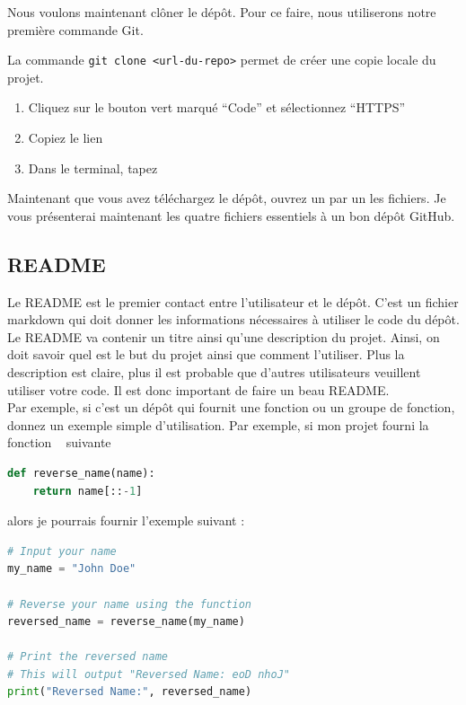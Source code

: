 \documentclass{book}
\newenvironment{myexampleblock}[1]{%
    \tcolorbox[beamer,%
    noparskip,breakable,
    colback=LightGreen,colframe=DarkGreen,%
    colbacklower=LimeGreen!75!LightGreen,%
    title={#1}, width=\textwidth]}%
    {\endtcolorbox}
\newenvironment{myblock}[1]{%
    \tcolorbox[beamer,%
    noparskip,breakable,
    colback=LightBlue,colframe=DarkBlue,%
    colbacklower=DarkBlue!75!LightBlue,%
    title={#1}, width=\textwidth]}%
    {\endtcolorbox}
\newcommand{\code}[1]{\mbox{%
    \ttfamily
    \tcbox[
        on line,
        boxsep=0pt, left=4pt, right=4pt, top=2pt, bottom=1.5pt,
        toprule=0pt, rightrule=0pt, bottomrule=0pt, leftrule=0pt,
        oversize=0pt, enlarge left by=0pt, enlarge right by=0pt,
        colframe=white, colback=black!12,
        height=.8\baselineskip %
    ]{#1}%
}}
\begin{document}
Nous voulons maintenant clôner le dépôt. Pour ce faire, nous utiliserons notre première commande Git.

\begin{myblock}{\href{https://git-scm.com/docs/git-clone}{git clone}}
    La commande \texttt{git clone <url-du-repo>} permet de créer une copie locale du projet. 
\end{myblock}

\begin{myexampleblock}{Exercice : Clôner le dépôt du tutoriel}
    \begin{enumerate}
        \item Cliquez sur le bouton vert marqué ``Code'' et sélectionnez ``HTTPS''
        \item Copiez le lien
        \item Dans le terminal, tapez \code{\texttt{git clone <lien-du-repo>}}
    \end{enumerate}
\end{myexampleblock}

Maintenant que vous avez téléchargez le dépôt, ouvrez un par un les fichiers. Je vous présenterai maintenant les quatre fichiers essentiels à un bon dépôt GitHub.

\subsection{README}

Le README est le premier contact entre l'utilisateur et le dépôt. C'est un fichier markdown qui doit donner les informations nécessaires à utiliser le code du dépôt. Le README va contenir un titre ainsi qu'une description du projet. Ainsi, on doit savoir quel est le but du projet ainsi que comment l'utiliser. Plus la description est claire, plus il est probable que d'autres utilisateurs veuillent utiliser votre code. Il est donc important de faire un beau README. \\

Par exemple, si c'est un dépôt qui fournit une fonction ou un groupe de fonction, donnez un exemple simple d'utilisation. Par exemple, si mon projet fourni la fonction \code{\texttt{reverse\_name}} suivante

\begin{lstlisting}[language=Python]
def reverse_name(name):
    return name[::-1]
\end{lstlisting}

alors je pourrais fournir l'exemple suivant :
\begin{lstlisting}[language=Python, commentstyle=\small\ttfamily,]
# Input your name
my_name = "John Doe"

# Reverse your name using the function
reversed_name = reverse_name(my_name)

# Print the reversed name
# This will output "Reversed Name: eoD nhoJ"
print("Reversed Name:", reversed_name)
\end{lstlisting}
\end{document}
